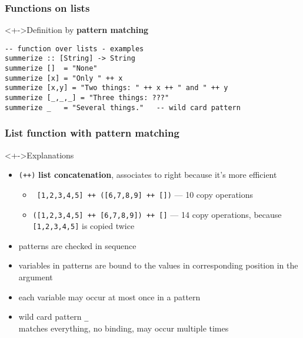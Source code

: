 \documentclass{beamer}
\begin{document}
\begin{frame}[fragile]
  \frametitle{Functions on lists}
  \begin{block}<+->{Definition by \textbf{pattern matching}}
\begin{verbatim}
-- function over lists - examples
summerize :: [String] -> String
summerize []  = "None"
summerize [x] = "Only " ++ x
summerize [x,y] = "Two things: " ++ x ++ " and " ++ y
summerize [_,_,_] = "Three things: ???"
summerize _   = "Several things."   -- wild card pattern
\end{verbatim}
  \end{block}
\end{frame}
\begin{frame}[fragile]
  \frametitle{List function with pattern matching}
  \begin{alertblock}<+->{Explanations}
    \small
    \begin{itemize}
    \item \texttt{(++)} \textbf{list concatenation}, associates to right because it's more efficient
      \begin{itemize}
      \item \texttt{ [1,2,3,4,5] ++ ([6,7,8,9] ++ [])} --- 10 copy
        operations
      \item 
        \texttt{([1,2,3,4,5] ++ [6,7,8,9]) ++ []} --- 14 copy operations,
        because \texttt{[1,2,3,4,5]} is copied twice
      \end{itemize}
    \item  patterns are checked in sequence
    \item  variables in patterns are bound to the values in
      corresponding position in the argument
    \item  each variable may occur at most once in a pattern
    \item wild card pattern \verb!_!\\ matches everything, no binding, may occur multiple times
    \end{itemize}
  \end{alertblock}
\end{frame}
\end{document}
